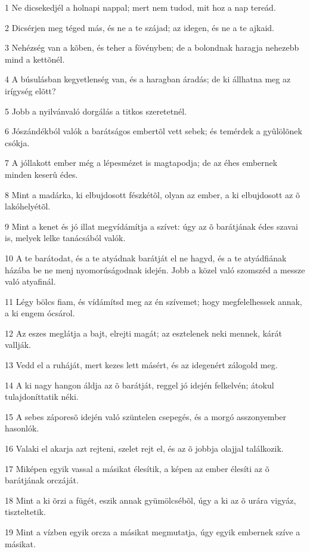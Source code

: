 \par 1 Ne dicsekedjél a holnapi nappal; mert nem tudod, mit hoz a nap tereád.
\par 2 Dicsérjen meg téged más, és ne a te szájad; az idegen, és ne a te ajkaid.
\par 3 Nehézség van a kõben, és teher a fövényben; de a bolondnak haragja nehezebb mind a kettõnél.
\par 4 A búsulásban kegyetlenség van, és a haragban áradás; de ki állhatna meg az irígység elõtt?
\par 5 Jobb a nyilvánvaló dorgálás a titkos szeretetnél.
\par 6 Jószándékból valók a barátságos embertõl vett sebek; és temérdek a gyûlölõnek csókja.
\par 7 A jóllakott ember még a lépesmézet is magtapodja; de az éhes embernek minden keserû édes.
\par 8 Mint a madárka, ki elbujdosott fészkétõl, olyan az ember, a ki elbujdosott az õ lakóhelyétõl.
\par 9 Mint a kenet és jó illat megvídámítja a szívet: úgy az õ barátjának édes szavai is, melyek lelke tanácsából valók.
\par 10 A te barátodat, és a te atyádnak barátját el ne hagyd, és a te atyádfiának házába be ne menj nyomorúságodnak idején. Jobb a közel való szomszéd a messze való atyafinál.
\par 11 Légy bölcs fiam, és vídámítsd meg az én szívemet; hogy megfelelhessek annak, a ki engem ócsárol.
\par 12 Az eszes meglátja a bajt, elrejti magát; az esztelenek neki mennek, kárát vallják.
\par 13 Vedd el a ruháját, mert kezes lett másért, és az idegenért zálogold meg.
\par 14 A ki nagy hangon áldja az õ barátját, reggel jó idején felkelvén; átokul tulajdoníttatik néki.
\par 15 A sebes záporesõ idején való szüntelen csepegés, és a morgó asszonyember hasonlók.
\par 16 Valaki el akarja azt rejteni, szelet rejt el, és az õ jobbja olajjal találkozik.
\par 17 Miképen egyik vassal a másikat élesítik, a képen az ember élesíti az õ barátjának orczáját.
\par 18 Mint a ki õrzi a fügét, eszik annak gyümölcsébõl, úgy a ki az õ urára vigyáz, tiszteltetik.
\par 19 Mint a vízben egyik orcza a másikat megmutatja, úgy egyik embernek szíve a másikat.
